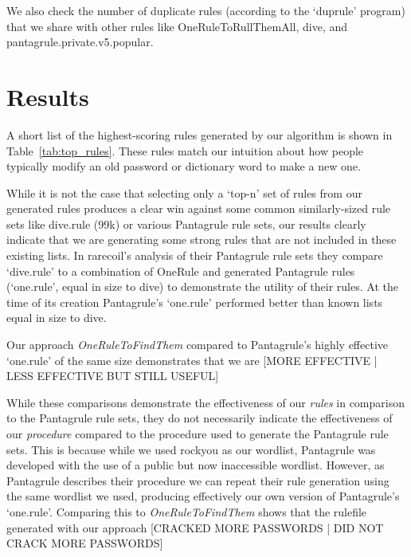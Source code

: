 \documentclass[letterpaper,twocolumn,10pt]{article}
\begin{document}
We also check the number of duplicate rules (according to the `duprule' program) that we share with other rules like OneRuleToRullThemAll, dive, and pantagrule.private.v5.popular.

\section{Results}
\label{sec:results}

A short list of the highest-scoring rules generated by our algorithm is shown
in Table~\ref{tab:top_rules}. These rules match our intuition about how people
typically modify an old password or dictionary word to make a new one.

While it is not the case that selecting only a `top-n' set of rules from our
generated rules produces a clear win against some common similarly-sized
rule sets like dive.rule (99k) or various Pantagrule rule sets, our results
clearly indicate that we are generating some strong rules that are not included
in these existing lists. In rarecoil's analysis of their Pantagrule rule sets
they compare `dive.rule' to a combination of OneRule and generated Pantagrule
rules (`one.rule', equal in size to dive) to demonstrate the utility of their
rules. At the time of its creation Pantagrule's `one.rule' performed better than
known lists equal in size to dive.

Our approach \textit{OneRuleToFindThem} compared to Pantagrule's highly
effective `one.rule' of
the same size demonstrates that we are [MORE EFFECTIVE | LESS EFFECTIVE BUT STILL USEFUL]

While these comparisons demonstrate the effectiveness of our \textit{rules} in
comparison to the Pantagrule rule sets, they do not necessarily indicate the
effectiveness of our \textit{procedure} compared to the procedure used to
generate the Pantagrule rule sets. This is because while we used rockyou as our
wordlist, Pantagrule was developed with the use of a public but now
inaccessible wordlist. However, as Pantagrule describes their procedure we can
repeat their rule generation using the same wordlist we used, producing
effectively our own version of Pantagrule's `one.rule'. Comparing this to
\textit{OneRuleToFindThem} shows that the rulefile generated with our approach
[CRACKED MORE PASSWORDS | DID NOT CRACK MORE PASSWORDS]
\end{document}
